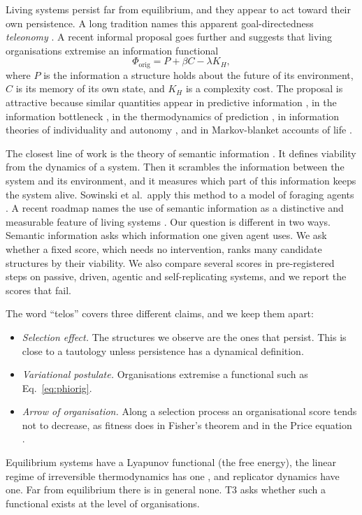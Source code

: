 \documentclass[11pt]{article}
\newcommand{\Phiorig}{\Phi_{\mathrm{orig}}}
\begin{document}
Living systems persist far from equilibrium, and they appear to act toward their own persistence. A long tradition
names this apparent goal-directedness \emph{teleonomy} \cite{Pittendrigh58,Mayr74}. A recent informal proposal goes
further and suggests that living organisations extremise an information functional
\begin{equation}
  \Phiorig = P + \beta C - \lambda K_H ,
  \label{eq:phiorig}
\end{equation}
where $P$ is the information a structure holds about the future of its environment, $C$ is its memory of its own
state, and $K_H$ is a complexity cost. The proposal is attractive because similar quantities appear in predictive
information \cite{BialekNemenmanTishby01}, in the information bottleneck \cite{Tishby99,Chechik05}, in the
thermodynamics of prediction \cite{Still12,ParrondoHorowitzSagawa15}, in information theories of individuality and
autonomy \cite{Krakauer20,BertschingerOlbrichAyJost08}, and in Markov-blanket accounts of life \cite{Friston13}.

The closest line of work is the theory of semantic information \cite{KolchinskyWolpert18}. It defines viability from
the dynamics of a system. Then it scrambles the information between the system and its environment, and it measures
which part of this information keeps the system alive. Sowinski et al.\ apply this method to a model of foraging
agents \cite{Sowinski23}. A recent roadmap names the use of semantic information as a distinctive and measurable
feature of living systems \cite{Bartlett25}. Our question is different in two ways. Semantic information asks which
information one given agent uses. We ask whether a fixed score, which needs no intervention, ranks many candidate
structures by their viability. We also compare several scores in pre-registered steps on passive, driven, agentic and
self-replicating systems, and we report the scores that fail.

The word ``telos'' covers three different claims, and we keep them apart:
\begin{itemize}
  \item[T1] \emph{Selection effect.} The structures we observe are the ones that persist. This is close to a tautology
  unless persistence has a dynamical definition.
  \item[T2] \emph{Variational postulate.} Organisations extremise a functional such as Eq.~\eqref{eq:phiorig}.
  \item[T3] \emph{Arrow of organisation.} Along a selection process an organisational score tends not to decrease, as
  fitness does in Fisher's theorem and in the Price equation \cite{Fisher30,Price70,Frank95}.
\end{itemize}
Equilibrium systems have a Lyapunov functional (the free energy), the linear regime of irreversible thermodynamics has
one \cite{Prigogine55}, and replicator dynamics have one. Far from equilibrium there is in general none. T3 asks whether
such a functional exists at the level of organisations.
\end{document}
